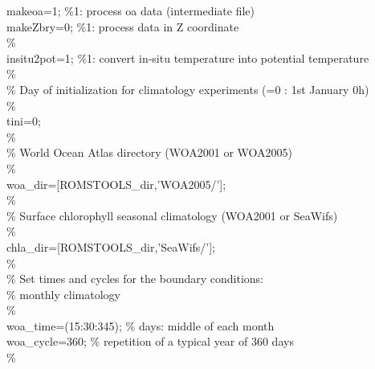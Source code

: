 makeoa=1;       \%1: process oa data (intermediate file)\\
makeZbry=0;     \%1: process data in Z coordinate\\
\%\\
insitu2pot=1;   \%1: convert in-situ temperature into potential temperature\\
\%\\
\%  Day of initialization for climatology experiments (=0 : 1st January 0h)\\
\%\\
tini=0;\\  
\%\\
\% World Ocean Atlas directory (WOA2001 or WOA2005) \\
\%\\
woa\_dir=[ROMSTOOLS\_dir,'WOA2005/'];\\
\%\\
\% Surface chlorophyll seasonal climatology (WOA2001 or SeaWifs)\\
\%\\
chla\_dir=[ROMSTOOLS\_dir,'SeaWifs/'];\\
\%\\
\%  Set times and cycles for the boundary conditions:\\ 
\%   monthly climatology \\
\%\\
woa\_time=(15:30:345); \% days: middle of each month\\
woa\_cycle=360;        \% repetition of a typical year of 360 days\\  
\%\\


